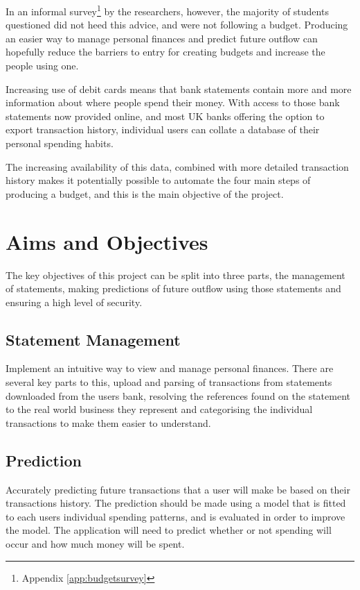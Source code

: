 In an informal survey\footnote{Appendix \ref{app:budgetsurvey}} by the researchers, however, the majority of students questioned did not heed this advice, and were not following a budget. Producing an easier way to manage personal finances and predict future outflow can hopefully reduce the barriers to entry for creating budgets and increase the people using one.

Increasing use of debit cards \parencite{bbc2010debit} means that bank statements contain more and more information about where people spend their money. With access to those bank statements now provided online, and most UK banks offering the option to export \gls{transaction} history, individual users can collate a database of their personal spending habits.

The increasing availability of this data, combined with more detailed \gls{transaction} history makes it potentially possible to automate the four main steps of producing a budget, and this is the main objective of the project.

\section{Aims and Objectives}
The key objectives of this project can be split into three parts, the management of statements, making predictions of future outflow using those statements and ensuring a high level of security.

\subsection{Statement Management}
Implement an intuitive way to view and manage personal finances.
%
There are several key parts to this, upload and parsing of \glspl{transaction} from statements downloaded from the users bank, resolving the \glspl{reference} found on the statement to the real world business they represent and categorising the individual \glspl{transaction} to make them easier to understand.
    
\subsection{Prediction}
Accurately predicting future \glspl{transaction} that a user will make be based on their \glspl{transaction} history.
%
The prediction should be made using a model that is fitted to each users individual spending patterns, and is evaluated in order to improve the model.
%
The application will need to predict whether or not spending will occur and how much money will be spent.


